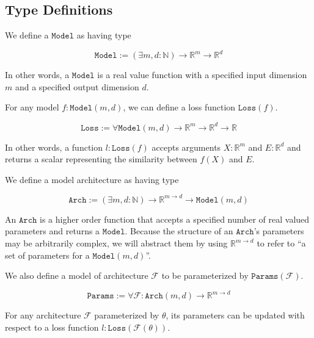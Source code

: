 \documentclass{article}
\begin{document}
\subsection{Type Definitions}
We define a $\mathtt{Model}$ as having type

\begin{equation}
  \mathtt{Model} := (\exists m,d : \mathbb{N}) \to \mathbb{R}^m \to \mathbb{R}^d
\end{equation}

In other words, a $\mathtt{Model}$ is a real value function with a specified input dimension $m$ and a specified output dimension $d$.

For any model $f : \mathtt{Model}(m,d)$, we can define a loss function $\mathtt{Loss}(f)$.

\begin{equation}
  \mathtt{Loss} := \forall \mathtt{Model}(m,d) \to \mathbb{R}^m \to \mathbb{R}^d \to \mathbb{R}
\end{equation}

In other words, a function $l : \mathtt{Loss}(f)$ accepts arguments $X : \mathbb{R}^m$ and $E : \mathbb{R}^d$ and returns a scalar representing the similarity between $f(X)$ and $E$.

We define a model architecture as having type

\begin{equation}
  \mathtt{Arch} := (\exists m,d : \mathbb{N}) \to \mathbb{R}^{m \to d} \to \mathtt{Model}(m,d)
\end{equation}

An $\mathtt{Arch}$ is a higher order function that accepts a specified number of real valued parameters and returns a $\mathtt{Model}$.
Because the structure of an $\mathtt{Arch}$'s parameters may be arbitrarily complex, we will abstract them by using $\mathbb{R}^{m \to d}$ to refer to ``a set of parameters for a $\mathtt{Model}(m,d)$''.

We also define a model of architecture $\mathcal{F}$ to be parameterized by $\mathtt{Params}(\mathcal{F})$.

\begin{equation}
  \mathtt{Params} := \forall \mathcal{F}:\mathtt{Arch}(m,d) \to \mathbb{R}^{m \to d}
\end{equation}

For any architecture $\mathcal{F}$ parameterized by $\theta$, its parameters can be updated with respect to a loss function $l : \mathtt{Loss}(\mathcal{F}(\theta))$.
\end{document}
